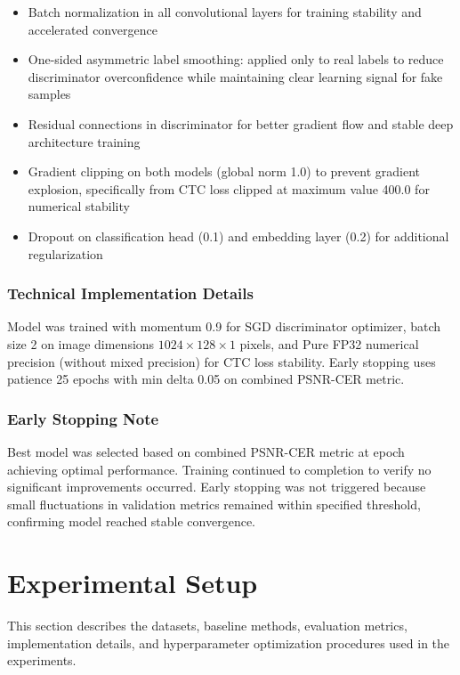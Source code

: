 \documentclass[journal]{IEEEtran}
\begin{document}
\begin{itemize}
    \item Batch normalization in all convolutional layers for training stability and accelerated convergence
    \item One-sided asymmetric label smoothing: applied only to real labels to reduce discriminator overconfidence while maintaining clear learning signal for fake samples
    \item Residual connections in discriminator for better gradient flow and stable deep architecture training
    \item Gradient clipping on both models (global norm 1.0) to prevent gradient explosion, specifically from CTC loss clipped at maximum value 400.0 for numerical stability
    \item Dropout on classification head (0.1) and embedding layer (0.2) for additional regularization
\end{itemize}

\subsubsection{Technical Implementation Details} 
Model was trained with momentum 0.9 for SGD discriminator optimizer, batch size 2 on image dimensions $1024 \times 128 \times 1$ pixels, and Pure FP32 numerical precision (without mixed precision) for CTC loss stability. Early stopping uses patience 25 epochs with min delta 0.05 on combined PSNR-CER metric.

\subsubsection{Early Stopping Note} 
Best model was selected based on combined PSNR-CER metric at epoch achieving optimal performance. Training continued to completion to verify no significant improvements occurred. Early stopping was not triggered because small fluctuations in validation metrics remained within specified threshold, confirming model reached stable convergence.

\section{Experimental Setup}

This section describes the datasets, baseline methods, evaluation metrics, implementation details, and hyperparameter optimization procedures used in the experiments.
\end{document}

